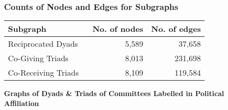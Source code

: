 \documentclass{beamer}
\begin{document}
\begin{frame}
\frametitle{Counts of Nodes and Edges for Subgraphs}

\begin{table}[!htb]
\centering
\begin{tabular}{lrr}
\toprule
{\bf{Subgraph}} &       {\bf{No.  of nodes}} &       {\bf{No.  of edges}} \\
\midrule
Reciprocated Dyads \ &     5,589  & 37,658 \\
   Co-Giving Triads  & 8,013 & 231,698 \\
Co-Receiving Triads  & 8,109 & 119,584 \\
\bottomrule
\end{tabular}
\end{table}

\end{frame}












\begin{frame}[plain,c,label=L3]

\begin{center}
\Huge {\bf{\color{teal}Graphs of Dyads \& Triads of Committees Labelled in Political Affiliation}}
\end{center}

\end{frame}
\end{document}
